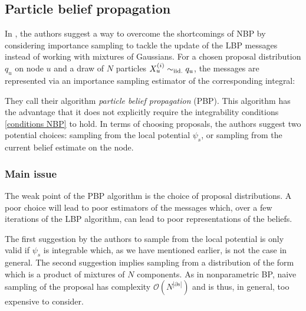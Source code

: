 \subsection{\label{point:PBP}Particle belief propagation}

In \citet{ihler09}, the authors suggest a way to overcome the shortcomings of NBP by considering importance sampling to tackle the update of the LBP messages instead of working with mixtures of Gaussians. For a chosen proposal distribution $q_{u}$ on node $u$ and a draw of $N$ particles $X_{u}^{(i)}\sim_{\mathrm{iid.}} q_{u}$, the messages are represented via an importance sampling estimator of the corresponding integral:

They call their algorithm \emph{particle belief propagation} (PBP).
This algorithm has the advantage that it does not explicitly require the integrability conditions \eqref{conditions NBP} to hold. 
In terms of choosing proposals, the authors suggest two potential choices: sampling from the local potential $\psi_{s}$, or sampling from the current belief estimate on the node. 

\subsubsection{Main issue}

The weak point of the PBP algorithm is the choice of proposal distributions.  A poor choice will lead to poor estimators of the messages which, over a few iterations of the LBP algorithm, can lead to poor representations of the beliefs.

The first suggestion by the authors to sample from the local potential is only valid if $\psi_{s}$ is integrable which, as we have mentioned earlier, is not the case in general. The second suggestion implies sampling from a distribution of the form
%
%
which is a product of mixtures of $N$ components. As in nonparametric BP, naive sampling of the proposal has complexity $\mathcal O {(N^{|\partial {s}|})}$ and is thus, in general, too expensive to consider.

